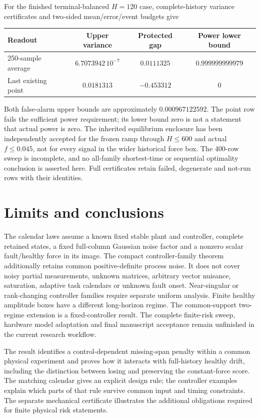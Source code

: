 \documentclass[11pt]{article}
\begin{document}
For the finished terminal-balanced $H=120$ case, complete-history variance
certificates and two-sided mean/error/event budgets give
\begin{center}
\begin{tabular}{lccc}
\toprule
Readout & Upper variance & Protected gap & Power lower bound\\
\midrule
250-sample average & $6.7073942\,10^{-7}$ & $0.0111325$ & $0.999999999979$\\
Last existing point & $0.0181313$ & $-0.453312$ & $0$\\
\bottomrule
\end{tabular}
\end{center}
Both false-alarm upper bounds are approximately $0.000967122592$.
The point row fails the sufficient power requirement; its lower bound zero is
not a statement that actual power is zero. The inherited equilibrium enclosure
has been independently accepted for the frozen ramp through $H\le600$
and actual $f\le0.045$, not for every signal in the wider historical force box.
The 400-row sweep is incomplete, and no all-family shortest-time or sequential
optimality conclusion is asserted here. Full certificates retain failed,
degenerate and not-run rows with their identities.

\section{Limits and conclusions}
The calendar laws assume a known fixed stable plant and controller, complete
retained states, a fixed full-column Gaussian noise factor and a nonzero scalar
fault/healthy force in its image. The compact controller-family theorem
additionally retains common positive-definite process noise.
It does not cover noisy partial measurements, unknown matrices, arbitrary
vector nuisance, saturation, adaptive task calendars or unknown fault onset.
Near-singular or rank-changing controller families require separate uniform
analysis. Finite healthy amplitude boxes have a different long-horizon regime.
The common-support two-regime extension is a fixed-controller result.
The complete finite-risk sweep, hardware model adaptation and final manuscript
acceptance remain unfinished in the current research workflow.

The result identifies a control-dependent missing-span penalty within a
common physical experiment and proves how it interacts with full-history
healthy drift, including the distinction between losing and preserving the
constant-force score. The matching calendar gives an explicit design rule; the
controller examples explain which parts of that rule survive common input
and timing constraints. The separate mechanical certificate illustrates the
additional obligations required for finite physical risk statements.
\end{document}
